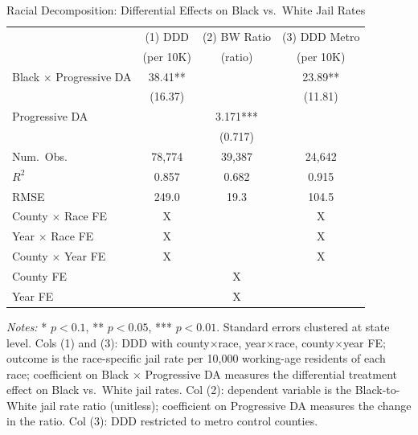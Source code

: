 \begin{table}[ht]
\centering
\caption{Racial Decomposition: Differential Effects on Black vs.\ White Jail Rates}
\label{tab:ddd}
\begin{tabular}{lccc}
\toprule
 & (1) DDD & (2) BW Ratio & (3) DDD Metro \\
 & (per 10K) & (ratio) & (per 10K) \\
\midrule
Black $\times$ Progressive DA & 38.41** &  & 23.89** \\
 & (16.37) &  & (11.81) \\
Progressive DA &  & 3.171*** &  \\
 &  & (0.717) &  \\
\midrule
Num.\ Obs. & 78,774 & 39,387 & 24,642 \\
$R^2$ & 0.857 & 0.682 & 0.915 \\
RMSE & 249.0 & 19.3 & 104.5 \\
County $\times$ Race FE & X &  & X \\
Year $\times$ Race FE & X &  & X \\
County $\times$ Year FE & X &  & X \\
County FE &  & X &  \\
Year FE &  & X &  \\
\bottomrule
\end{tabular}
\begin{minipage}{\textwidth}
\vspace{0.5em}
\small \textit{Notes:} * $p < 0.1$, ** $p < 0.05$, *** $p < 0.01$. Standard errors clustered at state level. Cols (1) and (3): DDD with county$\times$race, year$\times$race, county$\times$year FE; outcome is the race-specific jail rate per 10,000 working-age residents of each race; coefficient on Black $\times$ Progressive DA measures the differential treatment effect on Black vs.\ White jail rates. Col (2): dependent variable is the Black-to-White jail rate ratio (unitless); coefficient on Progressive DA measures the change in the ratio. Col (3): DDD restricted to metro control counties.
\end{minipage}
\end{table}
